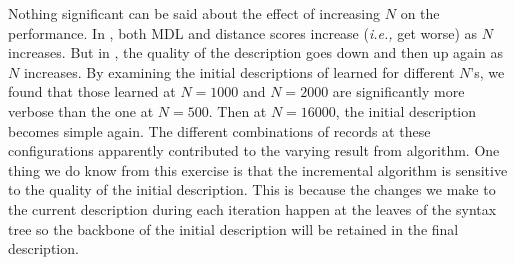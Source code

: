 
Nothing significant can be said about the effect of increasing $N$ on
the performance. In , both MDL and distance scores increase
({\em i.e.,} get worse) as $N$ increases. But in , the quality
of the description goes down and then up again as $N$ increases. By examining the
initial descriptions of  learned for different $N$'s,
we found that those learned at $N=1000$ and $N=2000$ are significantly more verbose than  
the one at $N=500$. Then at $N=16000$, the initial description becomes simple again.
The different combinations of records at these configurations apparently contributed to 
the varying result from \learnpads{} algorithm. One thing we do know from this exercise is that
the incremental algorithm is sensitive to the quality of the initial description.
This is because the changes we make to the current description during each iteration
happen at the leaves of the syntax tree so the backbone of the initial description
will be retained in the final description. 


